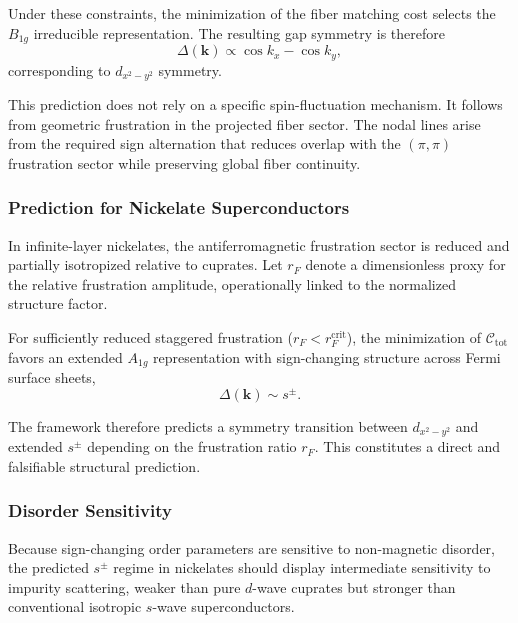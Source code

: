     Under these constraints, the minimization of the fiber matching
    cost selects the $B_{1g}$ irreducible representation.
    The resulting gap symmetry is therefore
    \begin{equation}
      \Delta(\mathbf{k}) \propto \cos k_x - \cos k_y,
    \end{equation}
    corresponding to $d_{x^2-y^2}$ symmetry.

    This prediction does not rely on a specific spin-fluctuation mechanism.
    It follows from geometric frustration in the projected fiber sector.
    The nodal lines arise from the required sign alternation that reduces
    overlap with the $(\pi,\pi)$ frustration sector while preserving
    global fiber continuity.

  \subsubsection*{Prediction for Nickelate Superconductors}

    In infinite-layer nickelates, the antiferromagnetic frustration sector
    is reduced and partially isotropized relative to cuprates.
    Let $r_F$ denote a dimensionless proxy for the relative frustration
    amplitude, operationally linked to the normalized structure factor.

    For sufficiently reduced staggered frustration ($r_F < r_F^{\text{crit}}$),
    the minimization of $\mathcal{C}_{\text{tot}}$ favors an extended
    $A_{1g}$ representation with sign-changing structure across Fermi
    surface sheets,
    \begin{equation}
      \Delta(\mathbf{k}) \sim s^{\pm}.
    \end{equation}

    The framework therefore predicts a symmetry transition between
    $d_{x^2-y^2}$ and extended $s^{\pm}$ depending on the frustration ratio $r_F$.
    This constitutes a direct and falsifiable structural prediction.

  \subsubsection*{Disorder Sensitivity}

    Because sign-changing order parameters are sensitive to non-magnetic
    disorder, the predicted $s^{\pm}$ regime in nickelates should display
    intermediate sensitivity to impurity scattering, weaker than pure
    $d$-wave cuprates but stronger than conventional isotropic $s$-wave
    superconductors.

